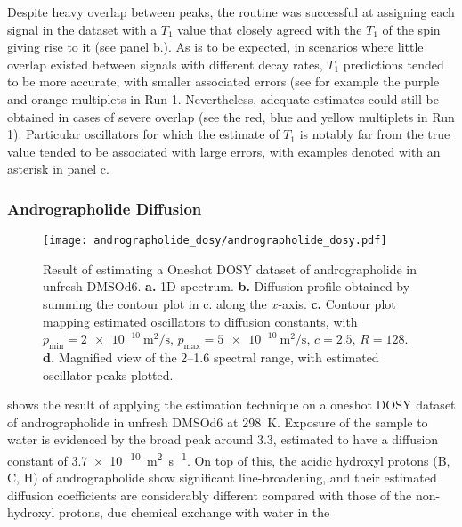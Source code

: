 Despite heavy overlap between peaks, the routine was successful at
assigning each signal in the dataset with a $T_1$ value that closely agreed
with the $T_1$ of the spin giving rise to it (see panel b.). As is to be
expected, in scenarios where little overlap existed between signals with
different decay rates, $T_1$ predictions tended to be more accurate, with
smaller associated errors (see for example the purple and orange multiplets in Run 1.
Nevertheless, adequate estimates could still be obtained in cases of severe
overlap (see the red, blue and yellow multiplets in Run 1). Particular
oscillators for which the estimate of $T_1$ is notably far from the true
value tended to be associated with large errors, with examples denoted with an
asterisk in panel c.

\subsubsection{Andrographolide Diffusion}
\begin{sidewaysfigure}
    \centering
    \texttt{[image: andrographolide\_dosy/andrographolide\_dosy.pdf]}
    \caption[
        Result of estimating a Oneshot \acs{DOSY} dataset of andrographolide.
    ]{
        Result of estimating a Oneshot \ac{DOSY} dataset of andrographolide in
        unfresh \ac{DMSOd6}.
        \textbf{a.} \ac{1D} spectrum.
        \textbf{b.} Diffusion profile obtained by summing the contour plot in
        c. along the $x$-axis.
        \textbf{c.} Contour plot mapping estimated oscillators to diffusion constants, with
        $p_{\text{min}} = \qty{2e-10}{\meter\squared\per\second}$,
        $p_{\text{max}} = \qty{5e-10}{\meter\squared\per\second}$,
        $c = 2.5$,
        $R=128$.
        \textbf{d.} Magnified view of the \SIrange{2}{1.6}{\partspermillion}
        spectral range, with estimated oscillator peaks plotted.
    }
    \label{fig:andrographolide-dosy}
\end{sidewaysfigure}
 shows the result of applying the
estimation technique on a oneshot \ac{DOSY} dataset of andrographolide in
unfresh \acs{DMSOd6} at \qty{298}{\kelvin}. Exposure of the sample to water is
evidenced by the broad
peak around \qty{3.3}{\partspermillion}, estimated to have a diffusion constant
of \qty{3.7e-10}{\meter\squared\per\second}. On top of this, the acidic
hydroxyl protons (B, C, H) of andrographolide show significant line-broadening,
and their estimated diffusion coefficients are considerably different compared
with those of the non-hydroxyl protons, due chemical exchange with water in the
